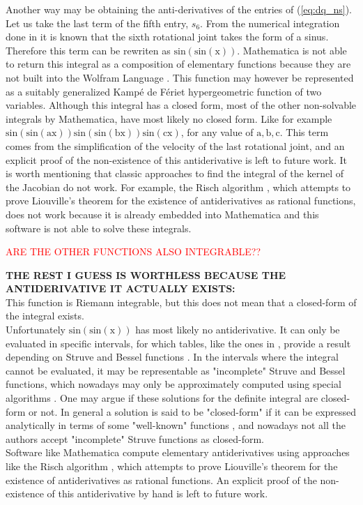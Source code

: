 Another way may be obtaining the anti-derivatives of the entries of (\ref{eq:dq_ns}). Let us take the last term of the fifth entry, $s_6$. From the numerical integration done in  \cite{fabianthesis} it is known that the sixth rotational joint takes the form of a sinus. Therefore this term can be rewriten as $\mathrm{sin(sin(x))}$.  
Mathematica is not able to return this integral as a composition of elementary functions because they are not built into the Wolfram Language \cite{wolfram}. This function may however be represented as a suitably generalized Kampé de Fériet hypergeometric function \cite{kampe} of two variables. Although this integral has a closed form, most of the other non-solvable integrals by Mathematica, have most likely no closed form. Like for example $\mathrm{sin(sin(ax))sin(sin(bx))sin(cx)}$, for any value of $\mathrm{a,b,c}$. This term comes from the simplification of the velocity of the last rotational joint, and an explicit proof of the non-existence of this antiderivative is left to future work. It is worth mentioning that classic approaches to find the integral of the kernel of the Jacobian do not work. For example, the Risch algorithm \cite{risch}, which attempts to prove Liouville's theorem \cite{lioville} for the existence of antiderivatives as rational functions, does not work because it is already embedded into Mathematica and this software is not able to solve these integrals.
 
\textcolor{red}{ARE THE OTHER FUNCTIONS ALSO INTEGRABLE??}
%

\textbf{THE REST I GUESS IS WORTHLESS BECAUSE THE ANTIDERIVATIVE IT ACTUALLY EXISTS:}\\
This function is Riemann integrable, but this does not mean that a closed-form of the integral exists. \\
Unfortunately $\mathrm{sin(sin(x))}$ has most likely no antiderivative. It can only be evaluated in specific intervals, for which tables, like the ones in \cite{hanbook_math}, provide a result depending on Struve and Bessel functions \cite{struve}. In the intervals where the integral cannot be evaluated, it may be representable as "incomplete" Struve and Bessel functions, which nowadays may only be approximately computed using special algorithms \cite{incomplete_bessel}. One may argue if these solutions for the definite integral are closed-form or not. In general a solution is said to be "closed-form" if it can be expressed analytically in terms of some "well-known" functions \cite{def_closed_form},  and nowadays not all the authors accept "incomplete" Struve functions as closed-form.  \\
Software like Mathematica compute elementary antiderivatives using approaches like the Risch algorithm \cite{risch}, which attempts to prove Liouville's theorem \cite{lioville} for the existence of antiderivatives as rational functions.  An explicit proof of the non-existence of this antiderivative  by hand is left to future work.

